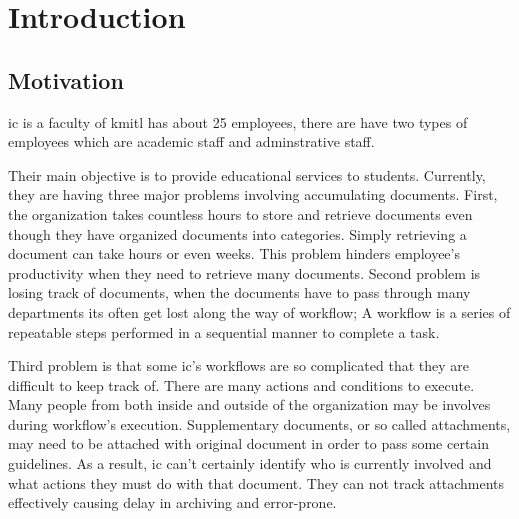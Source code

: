 \chapter{Introduction}

\section{Motivation}
\label{sec:motivation}

\gls{ic} is a faculty of \gls{kmitl} has about 25 employees, there are have two types of employees which are academic staff and adminstrative staff.

Their main objective is to provide educational services to students. 
Currently, they are having three major problems involving accumulating documents.
First, the organization takes countless hours to store and retrieve documents even though they have organized documents into categories.
Simply retrieving a document can take hours or even weeks. This problem hinders employee's productivity when they need to retrieve many documents. 
Second problem is losing track of documents, when the documents have to pass through many departments its often get lost along the way of workflow; A workflow is a series of repeatable steps performed in a sequential manner to complete a task.

Third problem is that some \gls{ic}'s workflows are so complicated that they are difficult to keep track of.
There are many actions and conditions to execute.
Many people from both inside and outside of the organization may be involves during workflow's execution.
Supplementary documents, or so called attachments, may need to be attached with original document in order to pass some certain guidelines.
As a result, \gls{ic} can't certainly identify who is currently involved and what actions they must do with that document.
They can not track attachments effectively causing delay in archiving and error-prone.

